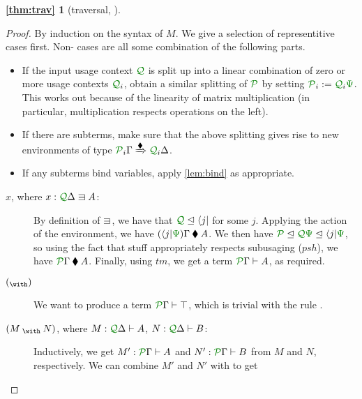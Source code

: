 \documentclass[submission,copyright,creativecommons]{eptcs}
\begin{document}
\newtheorem*{thm:trav}{\autoref{thm:trav}}
\begin{thm:trav}[traversal, ]
  \thmtrav
\end{thm:trav}
\begin{proof}
  By induction on the syntax of $M$.
  We give a selection of representitive cases first.
  Non- cases are all some combination of the following parts.
  \begin{itemize}
    \item If the input usage context $\resctx Q$ is split up into a linear
      combination of zero or more usage contexts $\resctx Q_{i}$, obtain a
      similar splitting of $\resctx P$ by setting
      $\resctx P_{i} := \resctx Q_{i}\rescomment\Psi$.
      This works out because of the linearity of matrix multiplication (in
      particular, multiplication respects operations on the left).
    \item If there are subterms, make sure that the above splitting gives rise
      to new environments of type
      $\resctx P_{i}\Gamma \subst{\kitrel} \resctx Q_{i}\Delta$.
    \item If any subterms bind variables, apply \autoref{lem:bind} as
      appropriate.
  \end{itemize}
  \begin{description}
    \item[ $x$, where $x : \ctx{\Delta}{Q} \lvar A$:]
      By definition of $\lvar$, we have that
      $\resctx Q \subres \langle j \rvert$ for some $j$.
      Applying the action of the environment, we have
      $(\langle j \rvert\rescomment\Psi)\Gamma \kitrel A$.
      We then have
      $\resctx P \subres \resctx Q\rescomment\Psi
      \subres \langle j \rvert\rescomment\Psi$,
      so using the fact that stuff appropriately respects subusaging
      ($\mathit{psh}$), we have $\ctx{\Gamma}{P} \kitrel A$.
      Finally, using $\mathit{tm}$, we get a term $\ctx{\Gamma}{P} \vdash A$, as
      required.
    \item[ $\eat$]
      We want to produce a term $\ctx{\Gamma}{P} \vdash \withTOne$, which is
      trivial with the rule .
    \item[ $\wth{M}{N}$, where
      $M : \ctx{\Delta}{Q} \vdash A$, $N : \ctx{\Delta}{Q} \vdash B$:]
      Inductively, we get $M' : \ctx{\Gamma}{P} \vdash A$ and
      $N' : \ctx{\Gamma}{P} \vdash B$ from
      $M$ and $N$, respectively.
      We can combine $M'$ and $N'$ with  to get

\end{description}
\end{proof}
\end{document}
